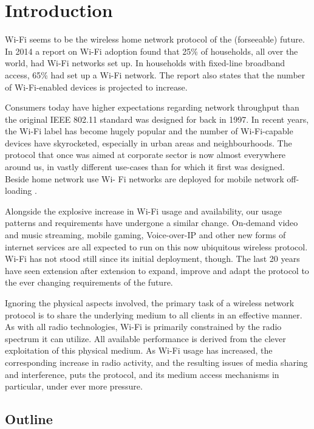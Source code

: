 
\chapter{Introduction}

Wi-Fi seems to be the wireless home network protocol of the (forseeable)
future. In 2014 a report on Wi-Fi adoption found that 25\% of households, all
over the world, had Wi-Fi networks set up. In households with fixed-line
broadband access, 65\% had set up a Wi-Fi network\cite{smith}. The report also
states that the number of Wi-Fi-enabled devices is projected to increase.

Consumers today have higher expectations regarding network throughput than the
original IEEE 802.11 standard was designed for back in 1997. In recent years,
the Wi-Fi label has become hugely popular and the number of Wi-Fi-capable
devices have skyrocketed, especially in urban areas and neighbourhoods. The
protocol that once was aimed at corporate sector is now almost everywhere
around us, in vastly different use-cases than for which it first was designed.
Beside home network use Wi- Fi networks are deployed for mobile network
off-loading \cite{offloading}.

Alongside the explosive increase in Wi-Fi usage and availability, our usage
patterns and requirements have undergone a similar change. On-demand video and
music streaming, mobile gaming, Voice-over-IP and other new forms of internet
services are all expected to run on this now ubiquitous wireless protocol.
Wi-Fi has not stood still since its initial deployment, though. The last 20 years have seen
extension after extension to expand, improve and adapt the protocol to the
ever changing requirements of the future.

Ignoring the physical aspects involved, the primary task of a wireless network
protocol is to share the underlying medium to all clients in an effective
manner. As with all radio technologies, Wi-Fi is primarily constrained by the
radio spectrum it can utilize. All available performance is derived from the
clever exploitation of this physical medium. As Wi-Fi usage has increased, the
corresponding increase in radio activity, and the resulting issues of media
sharing and interference, puts the protocol, and its medium access mechanisms
in particular, under ever more pressure.

\section{Outline}

